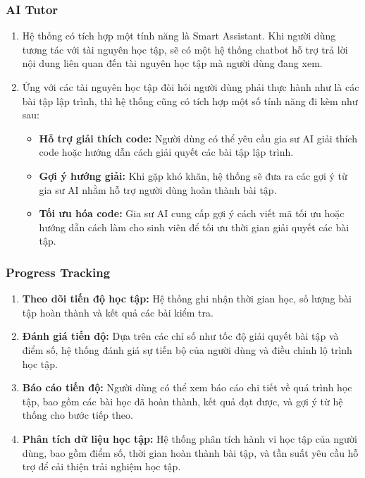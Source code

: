 \subsubsection{AI Tutor}
\begin{enumerate}
\item Hệ thống có tích hợp một tính năng là Smart Assistant. Khi người dùng tương tác với tài nguyên học tập, sẽ có một hệ thống chatbot hỗ trợ trả lời nội dung liên quan đến tài nguyên học tập mà người dùng đang xem.
\item Ứng với các tài nguyên học tập đòi hỏi người dùng phải thực hành như là các bài tập lập trình, thì hệ thống cũng có tích hợp một số tính năng đi kèm như sau:
\begin{itemize}
    \item \textbf{Hỗ trợ giải thích code:} Người dùng có thể yêu cầu gia sư AI giải thích code hoặc hướng dẫn cách giải quyết các bài tập lập trình.
    \item \textbf{Gợi ý hướng giải:} Khi gặp khó khăn, hệ thống sẽ đưa ra các gợi ý từ gia sư AI nhằm hỗ trợ người dùng hoàn thành bài tập.
    \item \textbf{Tối ưu hóa code:} Gia sư AI cung cấp gợi ý cách viết mã tối ưu hoặc hướng dẫn cách làm cho sinh viên để tối ưu thời gian giải quyết các bài tập.
\end{itemize}
\end{enumerate}
\subsubsection{Progress Tracking}
\begin{enumerate}
    \item \textbf{Theo dõi tiến độ học tập:} Hệ thống ghi nhận thời gian học, số lượng bài tập hoàn thành và kết quả các bài kiểm tra.
\item \textbf{Đánh giá tiến độ:} Dựa trên các chỉ số như tốc độ giải quyết bài tập và điểm số, hệ thống đánh giá sự tiến bộ của người dùng và điều chỉnh lộ trình học tập.
\item \textbf{Báo cáo tiến độ:} Người dùng có thể xem báo cáo chi tiết về quá trình học tập, bao gồm các bài học đã hoàn thành, kết quả đạt được, và gợi ý từ hệ thống cho bước tiếp theo.
\item \textbf{Phân tích dữ liệu học tập:} Hệ thống phân tích hành vi học tập của người dùng, bao gồm điểm số, thời gian hoàn thành bài tập, và tần suất yêu cầu hỗ trợ để cải thiện trải nghiệm học tập.
\end{enumerate}
